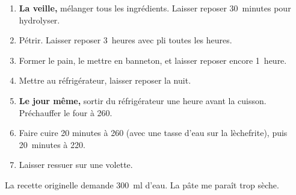 
\begin{ingredients}
\end{ingredients}


\begin{recipe}
  \begin{enumerate}

  \item \textbf{La veille,} mélanger tous les ingrédients.  Laisser
    reposer 30~minutes pour hydrolyser.
    
  \item Pétrir.  Laisser reposer 3~heures avec pli toutes les heures.
    
  \item Former le pain, le mettre en banneton, et laisser reposer
    encore 1~heure.

  \item Mettre au réfrigérateur, laisser reposer la nuit.
    
  \item \textbf{Le jour même,} sortir du réfrigérateur une heure avant
    la cuisson.  Préchauffer le four à 260\degreeC.

  \item Faire cuire 20 minutes à 260\degreeC{} (avec une tasse d'eau sur
    la lèchefrite), puis 20~minutes à 220\degreeC.
    
  \item Laisser ressuer sur une volette.

  \end{enumerate}
\end{recipe}


La recette originelle demande 300~ml d'eau.  La pâte me paraît trop
sèche.

